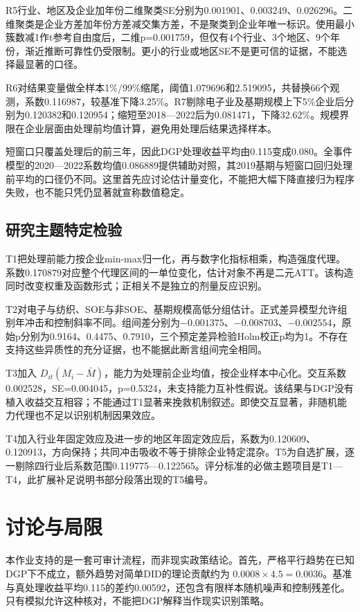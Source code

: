 \documentclass[UTF8,11pt,fontset=none]{ctexart}
\begin{document}
R5行业、地区及企业加年份二维聚类SE分别为0.001901、0.003249、0.026296。二维聚类是企业方差加年份方差减交集方差，不是聚类到企业年唯一标识\cite{cgm}。使用最小簇数减1作t参考自由度后，二维p=0.001759，但仅有4个行业、3个地区、9个年份，渐近推断可靠性仍受限制。更小的行业或地区SE不是更可信的证据，不能选择最显著的口径。

R6对结果变量做全样本1\%/99\%缩尾，阈值1.079696和2.519095，共替换66个观测，系数0.116987，较基准下降3.25\%。R7剔除电子业及基期规模上下5\%企业后分别为0.120382和0.120954；缩短至2018—2022后为0.081471，下降32.62\%。规模界限在企业层面由处理前均值计算，避免用处理后结果选择样本。

短窗口只覆盖处理后的前三年，因此DGP处理收益平均由0.115变成0.080。全事件模型的2020—2022系数均值0.086889提供辅助对照，其2019基期与短窗口回归处理前平均的口径仍不同。这里首先应讨论估计量变化，不能把大幅下降直接归为程序失败，也不能只凭仍显著就宣称数值稳定。

\subsection{研究主题特定检验}
T1把处理前能力按企业min-max归一化，再与数字化指标相乘，构造强度代理。系数0.170879对应整个代理区间的一单位变化，估计对象不再是二元ATT。该构造同时改变权重及函数形式；正相关不是独立的剂量反应识别。

T2对电子与纺织、SOE与非SOE、基期规模高低分组估计。正式差异模型允许组别年冲击和控制斜率不同。组间差分别为$-0.001375$、$-0.008703$、$-0.002554$，原始p分别为0.9164、0.4475、0.7910，三个预定差异检验Holm校正p均为1。不存在支持这些异质性的充分证据，也不能据此断言组间完全相同。

T3加入 $D_{it}(M_i-\bar M)$，能力为处理前企业均值，按企业样本中心化。交互系数0.002528，SE=0.004045，p=0.5324，未支持能力互补性假说。该结果与DGP没有植入收益交互相容；不能通过T1显著来挽救机制叙述。即使交互显著，非随机能力代理也不足以识别机制因果效应。

T4加入行业年固定效应及进一步的地区年固定效应后，系数为0.120609、0.120913，方向保持；共同冲击吸收不等于排除企业特定混杂。T5为自选扩展，逐一剔除四行业后系数范围0.119775—0.122565。评分标准的必做主题项目是T1—T4，此扩展补足说明书部分段落出现的T5编号。

\section{讨论与局限}
本作业支持的是一套可审计流程，而非现实政策结论。首先，严格平行趋势在已知DGP下不成立，额外趋势对简单DID的理论贡献约为 $0.0008\times4.5=0.0036$。基准与真处理收益平均0.115的差约0.00592，还包含有限样本随机噪声和控制残差化。只有模拟允许这种核对，不能把DGP解释当作现实识别策略。
\end{document}
